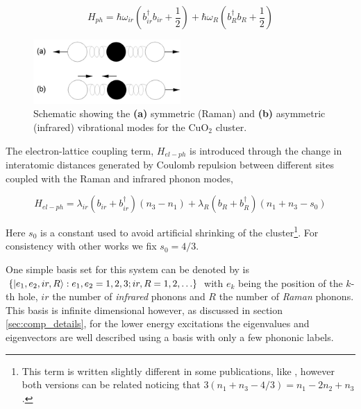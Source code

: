 \begin{equation}
 \label{eq:phonon-part}
 H_{ph} = \hbar \omega_{ir}\left(b_{ir}^\dagger b_{ir}+\frac{1}{2}\right) + \hbar \omega_R \left( b_R^\dagger b_R + \frac{1}{2}\right)
\end{equation}


\begin{figure}[ht!]
  \centering
  \includegraphics[width=0.5\textwidth]{images/CO2-vibrations.png}
  \caption{Schematic showing the \textbf{(a)} symmetric (Raman) and \textbf{(b)} asymmetric (infrared) vibrational modes for the CuO$_2$ cluster.}
  \label{fig:CO2-vibrations}
\end{figure}

 
The electron-lattice coupling term, $H_{el-ph}$ is introduced through the change in interatomic distances generated by Coulomb repulsion between different sites coupled with the Raman and infrared phonon modes,
 
\begin{equation}
  \label{eq:coupling-part}
  H_{el-ph} = \lambda_{ir}(b_{ir} + b_{ir}^\dagger)(n_3 - n_1) + \lambda_R (b_R + b_R^\dagger)(n_1 + n_3-s_0)
\end{equation}

Here $s_0$ is a constant used to avoid artificial shrinking of the cluster\footnote{This term is written slightly different in some publications, like \cite{MustredeLeon1992}, however both versions can be related noticing that $3 (n_1+n_3-4/3)=n_1-2n_2+n_3$.}. 
For consistency with other works \cite{MustredeLeon1992,DeLeon1999,Leon2008,MirandaMena2007} we fix $s_0=4/3$.


One simple basis set for this system can be denoted by is $\{\left | e_1,e_2,ir,R \right\rangle: e_1,e_2=1,2,3; ir,R=1,2,\ldots\}$ with $e_k$ being the position of the $k$-th hole, $ir$ the number of \textit{infrared} phonons and $R$ the number of \textit{Raman} phonons. 
This basis is infinite dimensional however, as discussed in section \ref{sec:comp_details}, for the lower energy excitations the eigenvalues and eigenvectors are well described using a basis with only a few phononic labels.

